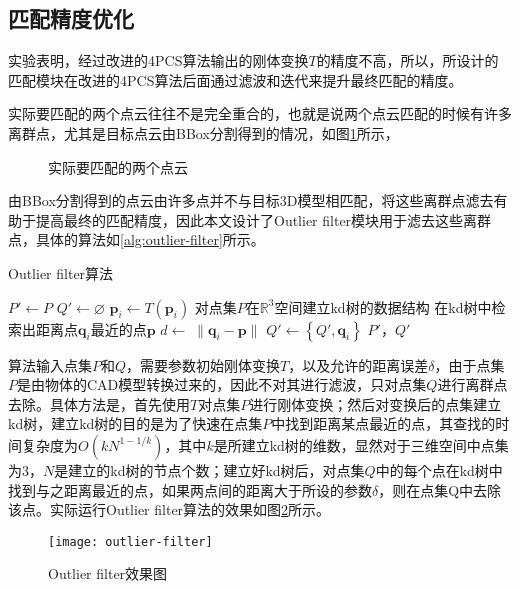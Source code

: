 \subsection{匹配精度优化}
实验表明，经过改进的4PCS算法输出的刚体变换$T$的精度不高，所以，所设计的匹配模块在改进的4PCS算法后面通过滤波和迭代来提升最终匹配的精度。

实际要匹配的两个点云往往不是完全重合的，也就是说两个点云匹配的时候有许多离群点，尤其是目标点云由BBox分割得到的情况，如图\ref{fig:outlier-pointcloud}所示，
\begin{figure}[ht]
  \centering
  \hskip1cm
  \caption{实际要匹配的两个点云}
  \label{fig:outlier-pointcloud}
\end{figure}
由BBox分割得到的点云由许多点并不与目标3D模型相匹配，将这些离群点滤去有助于提高最终的匹配精度，因此本文设计了Outlier filter模块用于滤去这些离群点，具体的算法如\ref{alg:outlier-filter}所示。
\begin{algorithm}[ht]
  \caption{Outlier filter算法}
  \label{alg:outlier-filter}
  $P'\leftarrow P$\;
  $Q'\leftarrow \varnothing$\;
   {
    $\mathbf{p}_i\leftarrow T(\mathbf{p}_i)$\;
  }
  对点集$P$在$\mathbb{R}^3$空间建立kd树的数据结构\;
   {
    在kd树中检索出距离点$\mathbf{q}_i$最近的点$\mathbf{p}$\;
    $d\leftarrow\;\parallel\mathbf{q}_i-\mathbf{p}\parallel$\;
     {
      $Q'\leftarrow \left\{Q', \mathbf{q}_i\right\}$\;
    }
  }
  \Return $P'$，$Q'$\;
\end{algorithm}
算法输入点集$P$和$Q$，需要参数初始刚体变换$T$，以及允许的距离误差$\delta$，由于点集$P$是由物体的CAD模型转换过来的，因此不对其进行滤波，只对点集$Q$进行离群点去除。具体方法是，首先使用$T$对点集$P$进行刚体变换；然后对变换后的点集建立kd树，建立kd树的目的是为了快速在点集$P$中找到距离某点最近的点，其查找的时间复杂度为$O(kN^{1-1/k})$，其中$k$是所建立kd树的维数，显然对于三维空间中点集为3，$N$是建立的kd树的节点个数；建立好kd树后，对点集$Q$中的每个点在kd树中找到与之距离最近的点，如果两点间的距离大于所设的参数$\delta$，则在点集Q中去除该点。实际运行Outlier filter算法的效果如图\ref{fig:outlier-filter}所示。
\begin{figure}[ht]
  \centering
  \texttt{[image: outlier-filter]}
  \caption{Outlier filter效果图}
  \label{fig:outlier-filter}
\end{figure}

